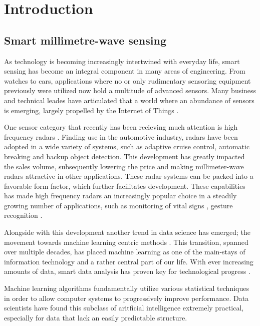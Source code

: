 \chapter{Introduction}

\section{Smart millimetre-wave sensing}

As technology is becoming increasingly intertwined with everyday life, smart sensing has become an integral component in many areas of engineering. From watches to cars, applications where no or only rudimentary sensoring equipment previously were utilized now hold a multitude of advanced sensors. Many business and technical leades have articulated that a world where an abundance of sensors is emerging, largely propelled by the Internet of Things \citep{bryzek_2013}. 

One sensor category that recently has been recieving much attention is high frequency radars \citep{frenzel_2018}. Finding use in the automotive industry, radars have been adopted in a wide variety of systems, such as adaptive cruise control, automatic breaking and backup object detection. This development has greatly impacted the sales volume, subsequently lowering the price and making millimeter-wave radars attractive in other applications. These radar systems can be packed into a favorable form factor, which further facilitates development. These capabilities has made high frequency radars an increasingly popular choice in a steadily growing number of applications, such as monitoring of vital signs \citep{kuo_lin_yu_lo_lyu_chou_chuang_2016}, gesture recognition \citep{lien_gillian_karagozler_amihood_schwesig_olson_raja_poupyrev_2016}.

Alongside with this development another trend in data science has emerged; the movement towards machine learning centric methods . This transition, spanned over multiple decades, has placed machine learning as one of the main-stays of information technology and a rather central part of our life. With ever increasing amounts of data, smart data analysis has proven key for technological progress \citep{a_smola_svn_vishwanathan_2010}.

Machine learning algorithms fundamentally utilize various statistical techniques in order to allow computer systems to progressively improve performance. Data scientists have found this subclass of aritficial intelligence extremely practical, especially for data that lack an easily predictable structure. 

